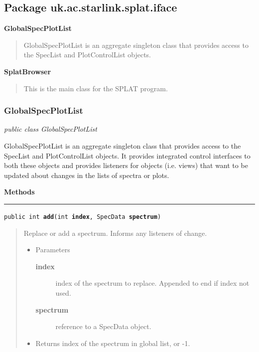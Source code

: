 \documentclass[twoside,11pt]{article}
\newcommand{\htmlref}[2]{#1}
\renewcommand{\_}{\texttt{\symbol{95}}}
\newcommand{\entityintro}[3]{
  \htmlref{\textbf{\Large{#1}}}{#2}
  \dotfill\pageref{#2}
  \begin{quote}
  #3
  \end{quote}
}
\newcommand{\startsection}[4]{
   \subsubsection{\label{#3}{#2}}
   #4
}
\newcommand{\method}[1]{\texttt{#1}}
\newenvironment{desc}{\begin{quote}}{\end{quote}}
\newcommand{\methods}{
   \par\textbf{\large{Methods}}\\
   \hrule
}
\begin{document}
\subsection{Package uk.ac.starlink.splat.iface}

\entityintro{GlobalSpecPlotList}{l259}{GlobalSpecPlotList is an aggregate singleton class that provides access
 to the SpecList and PlotControlList objects.}
\entityintro{SplatBrowser}{l260}{This is the main class for the SPLAT program.}
\clearpage
\startsection{Class}{GlobalSpecPlotList}{l259}

\fbox{\parbox{\textwidth}{
\textit{public
 class GlobalSpecPlotList}
}} %





{GlobalSpecPlotList is an aggregate singleton class that provides access
 to the SpecList and PlotControlList objects. It provides integrated
 control interfaces to both these objects and provides listeners for
 objects (i.e. views) that want to be updated about changes in the
 lists of spectra or plots.}
\methods
\method{public int \textbf{add}(\texttt{int} \textbf{index}, \texttt{SpecData} \textbf{spectrum})\label{l261}\label{l262}}
\begin{desc}Replace or add a spectrum. Informs any listeners of change.
\begin{itemize}
\item{Parameters
  \begin{description}
   \item[\textbf{index}]{index of the spectrum to replace. Appended to end
               if index not used.}
   \item[\textbf{spectrum}]{reference to a SpecData object.}
  \end{description}}
\end{itemize}
\begin{itemize}
\item{Returns index of the spectrum in global list, or -1. }
\end{itemize}
\end{desc}
\end{document}
